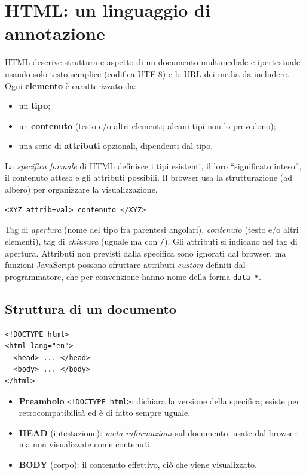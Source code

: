 \section{HTML: un linguaggio di annotazione}

HTML descrive struttura e aspetto di un documento multimediale e ipertestuale usando solo
testo semplice (codifica UTF-8) e le URL dei media da includere. Ogni \textbf{elemento} \`e
caratterizzato da:
\begin{itemize}
  \item un \textbf{tipo};
  \item un \textbf{contenuto} (testo e/o altri elementi; alcuni tipi non lo prevedono);
  \item una serie di \textbf{attributi} opzionali, dipendenti dal tipo.
\end{itemize}
La \emph{specifica formale} di HTML definisce i tipi esistenti, il loro ``significato
inteso'', il contenuto atteso e gli attributi possibili. Il browser usa la strutturazione
(ad albero) per organizzare la visualizzazione.

\begin{esempio}
\begin{lstlisting}[language=HTMLCSS]
<XYZ attrib=val> contenuto </XYZ>
\end{lstlisting}
Tag di \emph{apertura} (nome del tipo fra parentesi angolari), \emph{contenuto} (testo e/o
altri elementi), tag di \emph{chiusura} (uguale ma con \texttt{/}). Gli attributi si indicano
nel tag di apertura. Attributi non previsti dalla specifica sono ignorati dal browser, ma
funzioni JavaScript possono sfruttare attributi \emph{custom} definiti dal programmatore,
che per convenzione hanno nome della forma \texttt{data-*}.
\end{esempio}

\subsection{Struttura di un documento}
\begin{lstlisting}[language=HTMLCSS]
<!DOCTYPE html>
<html lang="en">
  <head> ... </head>
  <body> ... </body>
</html>
\end{lstlisting}
\begin{itemize}
  \item \textbf{Preambolo} \texttt{<!DOCTYPE html>}: dichiara la versione della specifica;
        esiste per retrocompatibilit\`a ed \`e di fatto sempre uguale.
  \item \textbf{HEAD} (intestazione): \emph{meta-informazioni} sul documento, usate dal
        browser ma non visualizzate come contenuti.
  \item \textbf{BODY} (corpo): il contenuto effettivo, ci\`o che viene visualizzato.
\end{itemize}

